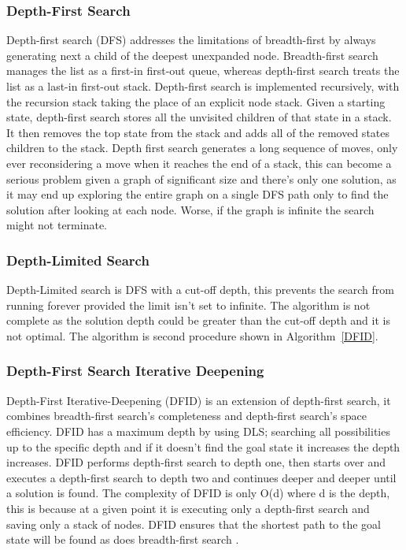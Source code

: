 \documentclass[final]{cmpreport}
\begin{document}
\subsubsection{Depth-First Search}
Depth-first search (DFS) addresses the limitations of breadth-first by always generating next a child of the deepest unexpanded node. Breadth-first search manages the list as a first-in first-out queue, whereas depth-first search treats the list as a last-in first-out stack. Depth-first search is implemented recursively, with the recursion stack taking the place of an explicit node stack. Given a starting state, depth-first search stores all the unvisited children of that state in a stack. It then removes the top state from the stack and adds all of the removed states children to the stack. Depth first search generates a long sequence of moves, only ever reconsidering a move when it reaches the end of a stack, this can become a serious problem given a graph of significant size and there's only one solution, as it may end up exploring the entire graph on a single DFS path only to find the solution after looking at each node. Worse, if the graph is infinite the search might not terminate.



\subsubsection{Depth-Limited Search}
Depth-Limited search is DFS with a cut-off depth, this prevents the search from running forever provided the limit isn't set to infinite. The algorithm is not complete as the solution depth could be greater than the cut-off depth and it is not optimal. The algorithm is second procedure shown in Algorithm~\ref{DFID}.


  
\subsubsection{Depth-First Search Iterative Deepening}
Depth-First Iterative-Deepening (DFID) is an extension of depth-first search, it combines breadth-first search's completeness and depth-first search's space efficiency. DFID has a maximum depth by using DLS; searching all possibilities up to the specific depth and if it doesn't find the goal state it increases the depth increases. DFID performs depth-first search to depth one, then starts over and executes a depth-first search to depth two and continues deeper and deeper until a solution is found. The complexity of DFID is only O(d) where d is the depth, this is because at a given point it is executing only a depth-first search and saving only a stack of nodes. DFID ensures that the shortest path to the goal state will be found as does breadth-first search \citep{DBLP:conf/otm/MeissnerB11}.
\end{document}
